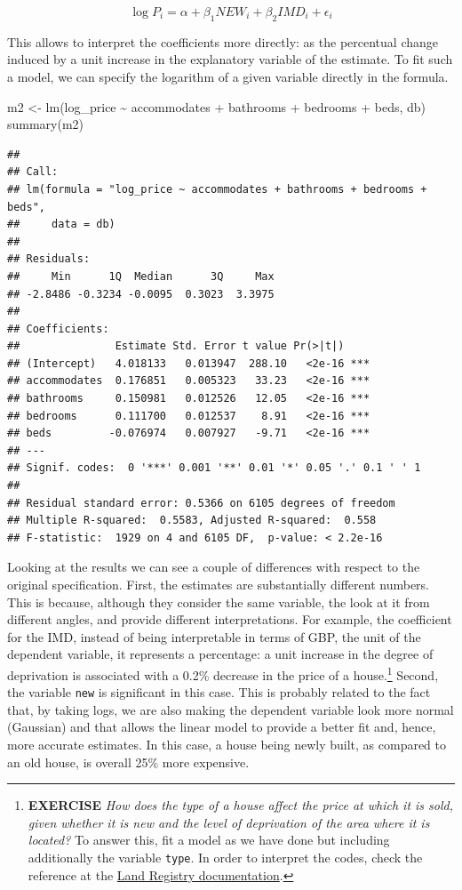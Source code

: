 \documentclass[
]{book}
\newenvironment{Shaded}{\begin{snugshade}}{\end{snugshade}}
\newcommand{\FunctionTok}[1]{\textcolor[rgb]{0.00,0.00,0.00}{#1}}
\newcommand{\NormalTok}[1]{#1}
\newcommand{\OtherTok}[1]{\textcolor[rgb]{0.56,0.35,0.01}{#1}}
\newcommand{\StringTok}[1]{\textcolor[rgb]{0.31,0.60,0.02}{#1}}
\begin{document}
\[
\log{P_i} = \alpha + \beta_1 NEW_i + \beta_2 IMD_i + \epsilon_i
\]

This allows to interpret the coefficients more directly: as the percentual change induced by a unit increase in the explanatory variable of the estimate. To fit such a model, we can specify the logarithm of a given variable directly in the formula.

\begin{Shaded}
\begin{Highlighting}[]
\NormalTok{m2 }\OtherTok{\textless{}{-}} \FunctionTok{lm}\NormalTok{(}\StringTok{\textquotesingle{}log\_price \textasciitilde{} accommodates + bathrooms + bedrooms + beds\textquotesingle{}}\NormalTok{, db)}
\FunctionTok{summary}\NormalTok{(m2)}
\end{Highlighting}
\end{Shaded}

\begin{verbatim}
## 
## Call:
## lm(formula = "log_price ~ accommodates + bathrooms + bedrooms + beds", 
##     data = db)
## 
## Residuals:
##     Min      1Q  Median      3Q     Max 
## -2.8486 -0.3234 -0.0095  0.3023  3.3975 
## 
## Coefficients:
##               Estimate Std. Error t value Pr(>|t|)    
## (Intercept)   4.018133   0.013947  288.10   <2e-16 ***
## accommodates  0.176851   0.005323   33.23   <2e-16 ***
## bathrooms     0.150981   0.012526   12.05   <2e-16 ***
## bedrooms      0.111700   0.012537    8.91   <2e-16 ***
## beds         -0.076974   0.007927   -9.71   <2e-16 ***
## ---
## Signif. codes:  0 '***' 0.001 '**' 0.01 '*' 0.05 '.' 0.1 ' ' 1
## 
## Residual standard error: 0.5366 on 6105 degrees of freedom
## Multiple R-squared:  0.5583, Adjusted R-squared:  0.558 
## F-statistic:  1929 on 4 and 6105 DF,  p-value: < 2.2e-16
\end{verbatim}

Looking at the results we can see a couple of differences with respect to the original specification. First, the estimates are substantially different numbers. This is because, although they consider the same variable, the look at it from different angles, and provide different interpretations. For example, the coefficient for the IMD, instead of being interpretable in terms of GBP, the unit of the dependent variable, it represents a percentage: a unit increase in the degree of deprivation is associated with a 0.2\% decrease in the price of a house.\footnote{\textbf{EXERCISE} \emph{How does the type of a house affect the price at which it is sold, given whether it is new and the level of deprivation of the area where it is located?} To answer this, fit a model as we have done but including additionally the variable \texttt{type}. In order to interpret the codes, check the reference at the \href{https://www.gov.uk/guidance/about-the-price-paid-data\#explanations-of-column-headers-in-the-ppd}{Land Registry documentation}.} Second, the variable \texttt{new} is significant in this case. This is probably related to the fact that, by taking logs, we are also making the dependent variable look more normal (Gaussian) and that allows the linear model to provide a better fit and, hence, more accurate estimates. In this case, a house being newly built, as compared to an old house, is overall 25\% more expensive.
\end{document}
